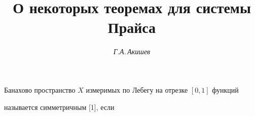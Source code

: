 











\setcounter{page}{3}















\author{\it Г.А.\,Акишев}




\title{О некоторых теоремах для системы Прайса}





\date{}




\pagestyle{plain} %







\maketitle


\label{begin}








Банахово пространство $X$ измеримых по Лебегу на отрезке $[0,1]$ функций 


называется симметричным [1], если 





